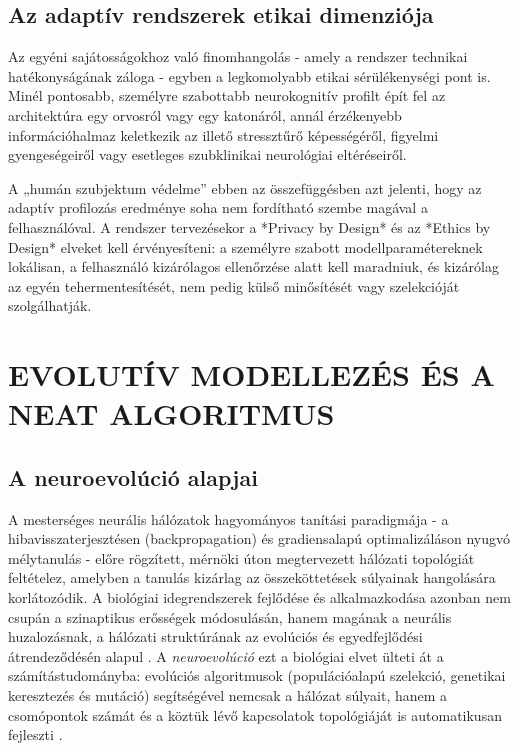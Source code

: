\documentclass[12pt,a4paper,oneside]{book}
\begin{document}
\subsection{Az adaptív rendszerek etikai dimenziója}

Az egyéni sajátosságokhoz való finomhangolás - amely a rendszer technikai hatékonyságának záloga - egyben a legkomolyabb etikai sérülékenységi pont is. Minél pontosabb, személyre szabottabb neurokognitív profilt épít fel az architektúra egy orvosról vagy egy katonáról, annál érzékenyebb információhalmaz keletkezik az illető stressztűrő képességéről, figyelmi gyengeségeiről vagy esetleges szubklinikai neurológiai eltéréseiről. 

A „humán szubjektum védelme” ebben az összefüggésben azt jelenti, hogy az adaptív profilozás eredménye soha nem fordítható szembe magával a felhasználóval. A rendszer tervezésekor a *Privacy by Design* és az *Ethics by Design* elveket kell érvényesíteni: a személyre szabott modellparamétereknek lokálisan, a felhasználó kizárólagos ellenőrzése alatt kell maradniuk, és kizárólag az egyén tehermentesítését, nem pedig külső minősítését vagy szelekcióját szolgálhatják.

\section{EVOLUTÍV MODELLEZÉS ÉS A NEAT ALGORITMUS}

\subsection{A neuroevolúció alapjai}

A mesterséges neurális hálózatok hagyományos tanítási paradigmája - a hibavisszaterjesztésen (backpropagation) és gradiensalapú optimalizáláson nyugvó mélytanulás - előre rögzített, mérnöki úton megtervezett hálózati topológiát feltételez, amelyben a tanulás kizárlag az összeköttetések súlyainak hangolására korlátozódik. A biológiai idegrendszerek fejlődése és alkalmazkodása azonban nem csupán a szinaptikus erősségek módosulásán, hanem magának a neurális huzalozásnak, a hálózati struktúrának az evolúciós és egyedfejlődési átrendeződésén alapul \cite{laCerra1998}. A \emph{neuroevolúció} ezt a biológiai elvet ülteti át a számítástudományba: evolúciós algoritmusok (populációalapú szelekció, genetikai keresztezés és mutáció) segítségével nemcsak a hálózat súlyait, hanem a csomópontok számát és a köztük lévő kapcsolatok topológiáját is automatikusan fejleszti \cite{stanley2002}.
\end{document}
